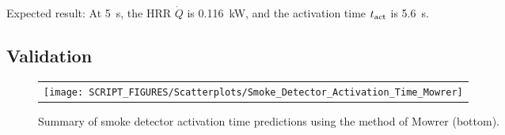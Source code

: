 \noindent Expected result: At 5~s, the HRR $\dot Q$ is 0.116~kW, and the activation time $t\sb{act}$ is 5.6~s.


\clearpage


\subsection*{Validation}

\begin{figure}[!ht]
\begin{center}
\begin{tabular}{l}
\texttt{[image: SCRIPT\_FIGURES/Scatterplots/Smoke\_Detector\_Activation\_Time\_Mowrer]}
\end{tabular}
\end{center}
\caption[Summary of smoke detector activation time predictions (Mowrer)]
{Summary of smoke detector activation time predictions using the method of Mowrer (bottom).}
\label{Smoke_Detector_Activation_Summary_Mowrer}
\end{figure}